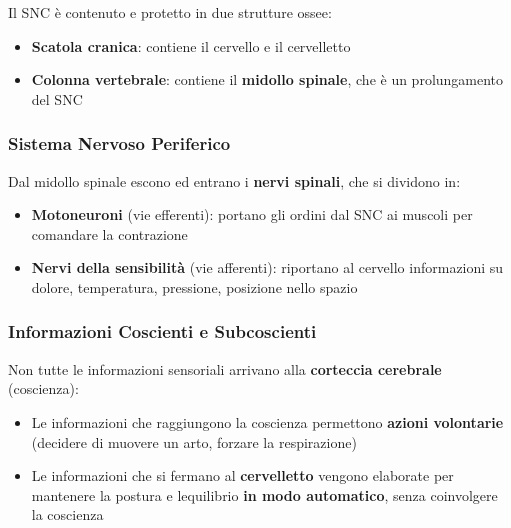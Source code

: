 \documentclass[a4paper,11pt]{article}
\providecommand{\tightlist}{%
  \setlength{\itemsep}{0pt}\setlength{\parskip}{0pt}}
\begin{document}
Il SNC è contenuto e protetto in due strutture ossee:

\begin{itemize}
      \tightlist
      \item
            \textbf{Scatola cranica}: contiene il cervello e il cervelletto
      \item
            \textbf{Colonna vertebrale}: contiene il \textbf{midollo spinale}, che
            è un prolungamento del SNC
\end{itemize}

\subsubsection{Sistema Nervoso
      Periferico}\label{sistema-nervoso-periferico}

Dal midollo spinale escono ed entrano i \textbf{nervi spinali}, che si
dividono in:

\begin{itemize}
      \tightlist
      \item
            \textbf{Motoneuroni} (vie efferenti): portano gli ordini dal SNC ai
            muscoli per comandare la contrazione
      \item
            \textbf{Nervi della sensibilità} (vie afferenti): riportano al
            cervello informazioni su dolore, temperatura, pressione, posizione
            nello spazio
\end{itemize}

\subsubsection{Informazioni Coscienti e
      Subcoscienti}\label{informazioni-coscienti-e-subcoscienti}

Non tutte le informazioni sensoriali arrivano alla \textbf{corteccia
      cerebrale} (coscienza):

\begin{itemize}
      \tightlist
      \item
            Le informazioni che raggiungono la coscienza permettono \textbf{azioni
                  volontarie} (decidere di muovere un arto, forzare la respirazione)
      \item
            Le informazioni che si fermano al \textbf{cervelletto} vengono
            elaborate per mantenere la postura e l\textquotesingle equilibrio
            \textbf{in modo automatico}, senza coinvolgere la coscienza
\end{itemize}
\end{document}
